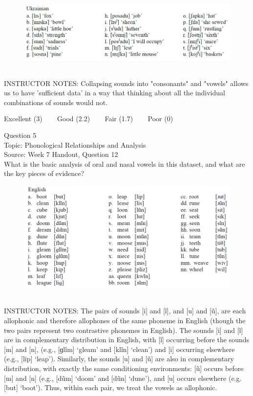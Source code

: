 \documentclass[12pt]{article}
\begin{document}
\begin{figure}[H]
\includegraphics{../images/ukrainian.png}
\end{figure}

~\\
INSTRUCTOR NOTES: Collapsing sounds into "consonants" and "vowels" allows us to have 'sufficient data' in a way that thinking about all the individual combinations of sounds would not.


\vfill
Excellent (3) ~~~ Good (2.2) ~~~ Fair (1.7) ~~~ Poor (0)
\newpage

{\large Question 5}\\

Topic: Phonological Relationships and Analysis\\
Source: Week 7 Handout, Question 12\\

What is the basic analysis of oral and nasal vowels in this dataset, and what are the key pieces of evidence?\\

\begin{figure}[H]
\includegraphics{../images/english12.png}
\end{figure}

~\\
INSTRUCTOR NOTES: The pairs of sounds [i] and [ĩ], and [u] and [ũ], are each allophonic and therefore allophones of the same phoneme in English (though the two pairs represent two contrastive phonemes in English). The sounds [i] and [ĩ] are in complementary distribution in English, with [ĩ] occurring before the sounds [m] and [n], (e.g., [ɡlĩm] ‘gleam’ and [klĩn] ‘clean’) and [i] occurring elsewhere (e.g., [lip] ‘leap’). Similarly, the sounds [u] and [ũ] are also in complementary distribution, with exactly the same conditioning environments: [ũ] occurs before [m] and [n] (e.g., [dũm] ‘doom’ and [dũn] ‘dune’), and [u] occurs elsewhere (e.g. [but] ‘boot’). Thus, within each pair, we treat the vowels as allophonic. 
\end{document}
